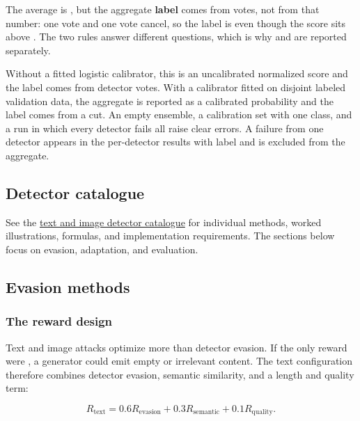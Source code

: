 The average is \texttt{},
but the aggregate \textbf{label} comes from votes, not from that number:
one \texttt{} vote and one \texttt{} vote
cancel, so the label is \texttt{} even though the
score sits above \texttt{}. The two rules answer different
questions, which is why \texttt{} and
\texttt{} are reported separately.

Without a fitted logistic calibrator, this is an uncalibrated normalized
score and the label comes from detector votes. With a calibrator fitted
on disjoint labeled validation data, the aggregate is reported as a
calibrated probability and the label comes from a
\texttt{} cut. An empty ensemble, a calibration set with
one class, and a run in which every detector fails all raise clear
errors. A failure from one detector appears in the per-detector results
with label \texttt{} and is excluded from the aggregate.

\subsection{Detector
catalogue}\label{record-docs-research-guide-md-detector-catalogue}

See the \href{records/DETECTORS.tex}{text and image detector catalogue}
for individual methods, worked illustrations, formulas, and
implementation requirements. The sections below focus on evasion,
adaptation, and evaluation.

\subsection{Evasion
methods}\label{record-docs-research-guide-md-evasion-methods}

\subsubsection{The reward
design}\label{record-docs-research-guide-md-the-reward-design}

Text and image attacks optimize more than detector evasion. If the only
reward were \texttt{}, a generator could
emit empty or irrelevant content. The text configuration therefore
combines detector evasion, semantic similarity, and a length and quality
term:

\[
R_{\mathrm{text}} = 0.6R_{\mathrm{evasion}}
                  + 0.3R_{\mathrm{semantic}}
                  + 0.1R_{\mathrm{quality}}.
\]

